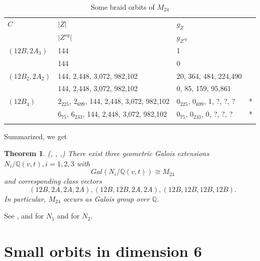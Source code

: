 \documentclass[12pt,a4paper]{article}
\newtheorem{theorem}{Theorem}[section]
\numberwithin{equation}{section}
\numberwithin{table}{section}
\begin{document}
%
\begin{table}[!htbp]
\centering
\footnotesize
\captionsetup{font=footnotesize}
\caption{Some braid orbits of $M_{24}$}
\label{tab:Data_BraidOrbitsOfM24}
\begin{tabular}{llll}
\hline\noalign{\smallskip}
$C$ & $ \vert Z \vert $      & $g_Z$ & \\
    & $ \vert Z^{sy} \vert $ & $g_{Z^{sy}}$ & \\
\noalign{\smallskip}\hline\noalign{\smallskip}
$(12B,2A_3)$   & 144 & 1 & \\
               & 144 & 0 & \\
\noalign{\smallskip}\hline\noalign{\smallskip}
$(12B_2,2A_2)$ & 144, 2,448, 3,072, 982,102 & 20, 364, 484, 224,490 & \\
               & 144, 2,448, 3,072, 982,102 & 0, 85, 159, 95,861 & \\
\noalign{\smallskip}\hline\noalign{\smallskip}
$(12B_4)$      & $2_{225}$, $2_{699}$, 144, 2,448, 3,072, 982,102 & $0_{225}$, $0_{699}$, 1, ?, ?, ? & *\\
               & $6_{75}$, $6_{233}$, 144, 2,448, 3,072, 982,102 & $0_{75}$, $0_{233}$, 0, ?, ?, ? & *\\
\noalign{\smallskip}\hline
\end{tabular}
\end{table}
%
\par
\noindent
Summarized, we get
\begin{theorem}
\label{M24AsGaloisGroup}
(\cite{RefHae1987}, \cite{RefHae1991}, \cite{RefMat1991},\cite{RefMM2018})
There exist three geometric Galois extensions $N_i/\mathbb{Q}(v,t), i=1,2,3$ with 
$$Gal(N_i/\mathbb{Q}(v,t)) \cong M_{24}$$
and corresponding class vectors 
$$(12B,2A,2A,2A), (12B,12B,2A,2A), (12B,12B,12B,12B).$$
In particular, $M_{24}$ occurs as Galois group over $\mathbb{Q}$.
\end{theorem}
%
\noindent
See \cite{RefHae1987}, \cite{RefMat1991} and \cite{RefMM2018} for $N_1$ and \cite{RefHae1991} for $N_2$.

\section{Small orbits in dimension 6}\label{SectionSmallOrbitsInDimension6}
\end{document}
